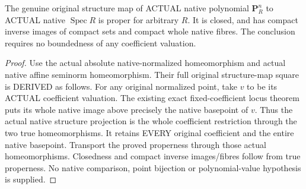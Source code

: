\begin{theorem}
\label{scheme:native-polynomial-projective-proper}
The genuine original structure map of ACTUAL native polynomial $\mathbf P^n_R$
to ACTUAL native $\operatorname{Spec}R$ is proper for arbitrary $R$. It is closed,
and has compact inverse images of compact sets and compact whole native fibres.
The conclusion requires no boundedness of any coefficient valuation.
\leanok
\end{theorem}
\begin{proof}
Use the actual absolute native-normalized homeomorphism and actual native affine
seminorm homeomorphism. Their full original structure-map square is DERIVED as
follows. For any original normalized point, take $v$ to be its ACTUAL coefficient
valuation. The existing exact fixed-coefficient locus theorem puts its whole
native image above precisely the native basepoint of $v$. Thus the actual native
structure projection is the whole coefficient restriction through the two true
homeomorphisms. It retains EVERY original coefficient and the entire native
basepoint. Transport the proved properness through those actual homeomorphisms.
Closedness and compact inverse images/fibres follow from true properness.
No native comparison, point bijection or polynomial-value hypothesis is supplied.
\end{proof}

